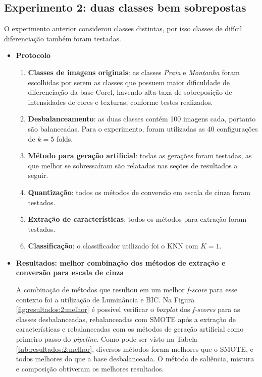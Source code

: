 \FloatBarrier
\subsection{Experimento 2: duas classes bem sobrepostas}

O experimento anterior considerou classes distintas, por isso classes de difícil diferenciação também foram testadas.

\begin{itemize}
\item[] \textbf{Protocolo}
\begin{enumerate}
\item \textbf{Classes de imagens originais}: as classes \textit{Praia} e \emph{Montanha} foram escolhidas por serem as classes que possuem maior dificuldade de diferenciação da base Corel, havendo alta taxa de sobreposição de intensidades de cores e texturas, conforme testes realizados.

\item \textbf{Desbalanceamento}: as duas classes contém 100 imagens cada, portanto são balanceadas. Para o experimento, foram utilizadas as 40 configurações de $k=5$ folds.

\item \textbf{Método para geração artificial}: todas as gerações foram testadas, as que melhor se sobressaíram são relatadas nas seções de resultados a seguir.

\item \textbf{Quantização}: todos os métodos de conversão em escala de cinza foram testados.

\item \textbf{Extração de características}: todos os métodos para extração foram testados.

\item \textbf{Classificação}: o classificador utilizado foi o KNN com $K=1$.
\end{enumerate}

\item[] \textbf{Resultados: melhor combinação dos métodos de extração e conversão para escala de cinza}

A combinação de métodos que resultou em um melhor \textit{f-score} para esse contexto foi a utilização de Luminância e BIC. Na Figura \ref{fig:resultados:2:melhor} é possível verificar o \textit{boxplot} dos \textit{f-scores} para as classes desbalanceadas, rebalanceadas com SMOTE após a extração de características e rebalanceadas com os métodos de geração artificial como primeiro passo do \textit{pipeline}. Como pode ser visto na Tabela \ref{tab:resultados:2:melhor}, diversos métodos foram melhores que o SMOTE, e todos melhores do que a base desbalanceada. O método de saliência, mistura e composição obtiveram os melhores resultados.


\end{itemize}
